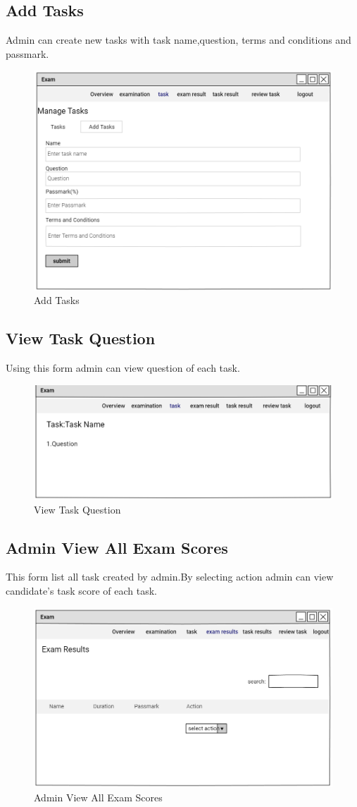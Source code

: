 \documentclass[a4paper,12pt]{report}
\begin{document}
\subsection {Add Tasks}
 Admin can create new tasks with task name,question, terms and conditions and passmark.
\begin{figure}[bph]
	\centering
	\includegraphics[width=.6\linewidth]{img/admin/addtask}
	\caption{Add Tasks}
\end{figure}

\subsection {View Task Question}
Using this form admin can view question of each task.
\begin{figure}[bph]
	\centering
	\includegraphics[width=.6\linewidth]{img/admin/viewtaskqstn}
	\caption{View Task Question}
\end{figure}
\pagebreak
\subsection { Admin View All Exam Scores}
This form list all task created by admin.By selecting action admin can view candidate's  task score of each task. 
\begin{figure}[bph]
	\centering
	\includegraphics[width=.6\linewidth]{img/admin/adviewallxmrslt}
	\caption{ Admin View All Exam Scores}
\end{figure}
\end{document}
